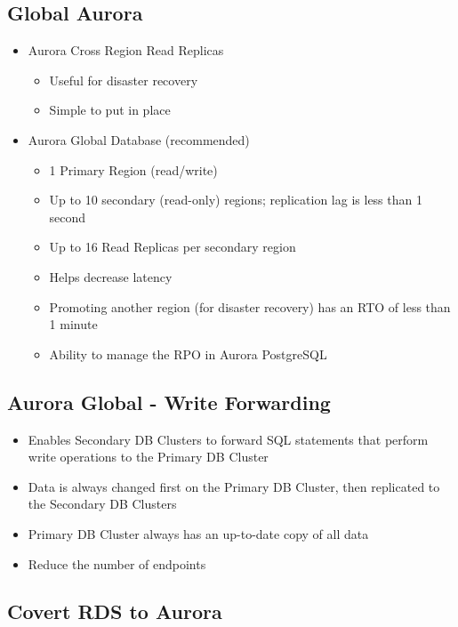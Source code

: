 \subsection{Global Aurora}
\begin{itemize}
    \item Aurora Cross Region Read Replicas
    \begin{itemize}
        \item Useful for disaster recovery
        \item Simple to put in place
    \end{itemize}

    \item Aurora Global Database (recommended)
    \begin{itemize}
        \item 1 Primary Region (read/write)
        \item Up to 10 secondary (read-only) regions; replication lag is less than 1 second
        \item Up to 16 Read Replicas per secondary region
        \item Helps decrease latency
        \item Promoting another region (for disaster recovery) has an RTO of less than 1 minute
        \item Ability to manage the RPO in Aurora PostgreSQL
    \end{itemize}
\end{itemize}

\subsection{Aurora Global - Write Forwarding}
\begin{itemize}
    \item Enables Secondary DB Clusters to forward SQL statements that perform write operations to the Primary DB Cluster
    \item Data is always changed first on the Primary DB Cluster, then replicated to the Secondary DB Clusters
    \item Primary DB Cluster always has an up-to-date copy of all data
    \item Reduce the number of endpoints
\end{itemize}

\subsection{Covert RDS to Aurora}
